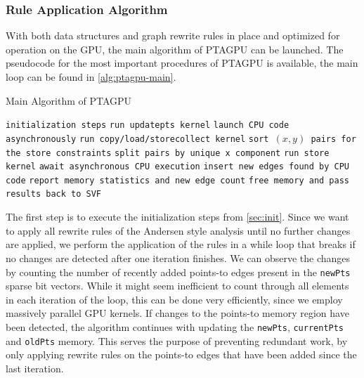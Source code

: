 \subsubsection{Rule Application Algorithm}\label{sec:main-algo}
With both data structures and graph rewrite rules in place and optimized for operation on the GPU, the main algorithm of PTAGPU can be launched.
The pseudocode for the most important procedures of PTAGPU is available, the main loop can be found in \autoref{alg:ptagpu-main}.
\begin{algorithm}
    \caption{Main Algorithm of PTAGPU}\label{alg:ptagpu-main}
    \begin{algorithmic}
        \State \texttt{initialization steps}
        \State \texttt{run updatepts kernel} 
        \State \texttt{launch CPU code asynchronously} 
        \State \texttt{run copy/load/storecollect kernel} 
        \State \texttt{sort $(x,y)$ pairs for the store constraints}
        \State \texttt{split pairs by unique x component}
        \State \texttt{run store kernel} 
        \State \texttt{await asynchronous CPU execution}
        \State \texttt{insert new edges found by CPU code}
        \State \texttt{report memory statistics and new edge count} 
        \EndWhile
        \State \texttt{free memory and pass results back to SVF}
    \end{algorithmic}
\end{algorithm}
The first step is to execute the initialization steps from \autoref{sec:init}.
Since we want to apply all rewrite rules of the Andersen style analysis until no further changes are applied, we perform the application of the rules in a while loop that breaks if no changes are detected after one iteration finishes.
We can observe the changes by counting the number of recently added points-to edges present in the \verb|newPts| sparse bit vectors.
While it might seem inefficient to count through all elements in each iteration of the loop, this can be done very efficiently, since we employ massively parallel GPU kernels.
If changes to the points-to memory region have been detected, the algorithm continues with updating the \verb|newPts|, \verb|currentPts| and \verb|oldPts| memory.
This serves the purpose of preventing redundant work, by only applying rewrite rules on the points-to edges that have been added since the last iteration.
